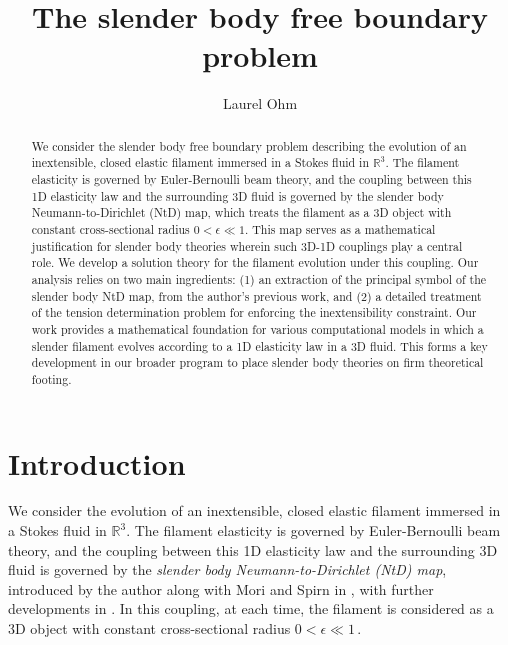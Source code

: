 \documentclass[11pt,reqno]{amsart}
\newcommand{\R}{\mathbb{R}}
\theoremstyle{definition}
\begin{document}
\title{The slender body free boundary problem}

\author{Laurel Ohm}
\address{Department of Mathematics, University of Wisconsin - Madison, Madison, WI 53706}


\begin{abstract} 
We consider the slender body free boundary problem describing the evolution of an inextensible, closed elastic filament immersed in a Stokes fluid in $\R^3$. The filament elasticity is governed by Euler-Bernoulli beam theory, and the coupling between this 1D elasticity law and the surrounding 3D fluid is governed by the slender body Neumann-to-Dirichlet (NtD) map, which treats the filament as a 3D object with constant cross-sectional radius $0<\epsilon\ll1$. This map serves as a mathematical justification for slender body theories wherein such 3D-1D couplings play a central role. We develop a solution theory for the filament evolution under this coupling. 
Our analysis relies on two main ingredients: (1) an extraction of the principal symbol of the slender body NtD map, from the author's previous work, and (2) a detailed treatment of the tension determination problem for enforcing the inextensibility constraint.
Our work provides a mathematical foundation for various computational models in which a slender filament evolves according to a 1D elasticity law in a 3D fluid. This forms a key development in our broader program to place slender body theories on firm theoretical footing.  
\end{abstract}

\maketitle

\tableofcontents

\setlength{\parskip}{8pt}
\section{Introduction}
We consider the evolution of an inextensible, closed elastic filament immersed in a Stokes fluid in $\R^3$. The filament elasticity is governed by Euler-Bernoulli beam theory, and the coupling between this 1D elasticity law and the surrounding 3D fluid is governed by the \emph{slender body Neumann-to-Dirichlet (NtD) map}, introduced by the author along with Mori and Spirn in \cite{closed_loop,free_ends}, with further developments in \cite{inverse,ohm2025angle,ohm2024free}.
In this coupling, at each time, the filament is considered as a 3D object with constant cross-sectional radius $0<\epsilon\ll1$\,.   
\end{document}
